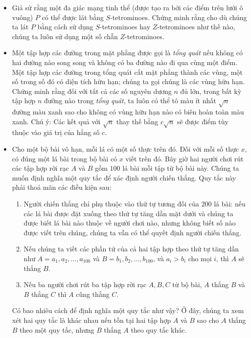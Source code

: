 \documentclass[11pt]{scrartcl}
\begin{document}
\begin{itemize}[label=, leftmargin=0em, itemsep=-0em]
    \item \begin{btvn}
    Giả sử rằng một đa giác mạng tinh thể (được tạo ra bởi các điểm trên lưới ô vuông) $P$ có thể được lát bằng $S$-tetrominoes. Chứng minh rằng cho dù chúng ta lát $P$ bằng cách sử dụng $S$-tetrominoes hay $Z$-tetrominoes như thế nào, chúng ta luôn sử dụng một số chẵn $Z$-tetrominoes.
    \end{btvn}
    \item \begin{btvn}
        Một tập hợp các đường trong mặt phẳng được gọi là \textit{tổng quát} nếu không có hai đường nào song song và không có ba đường nào đi qua cùng một điểm. Một tập hợp các đường trong tổng quát cắt mặt phẳng thành các vùng, một số trong số đó có diện tích hữu hạn; chúng ta gọi chúng là các vùng hữu hạn. Chứng minh rằng đối với tất cả các số nguyên dương $n$ đủ lớn, trong bất kỳ tập hợp $n$ đường nào trong \textit{tổng quát}, ta luôn có thể tô màu ít nhất $\sqrt{n}$ đường màu xanh sao cho không có vùng hữu hạn nào có biên hoàn toàn màu xanh.
    Chú ý: Các kết quả với $\sqrt{n}$ thay thế bằng $c\sqrt{n}$ sẽ được điểm tùy thuộc vào giá trị của hằng số $c$.
    \end{btvn}

    \item \begin{btvn}
        Cho một bộ bài vô hạn, mỗi lá có một số thực trên đó. Đối với mỗi số thực $x$, có đúng một lá bài trong bộ bài có $x$ viết trên đó. Bây giờ hai người chơi rút các tập hợp rời rạc $A$ và $B$ gồm $100$ lá bài mỗi tập từ bộ bài này. Chúng ta muốn định nghĩa một quy tắc để xác định người chiến thắng. Quy tắc này phải thoả mãn các điều kiện sau:
        \begin{enumerate}
            \item Người chiến thắng chỉ phụ thuộc vào thứ tự tương đối của $200$ lá bài: nếu các lá bài được đặt xuống theo thứ tự tăng dần mặt dưới và chúng ta được biết lá bài nào thuộc về người chơi nào, nhưng không biết số nào được viết trên chúng, chúng ta vẫn có thể quyết định người chiến thắng.
            \item Nếu chúng ta viết các phần tử của cả hai tập hợp theo thứ tự tăng dần như $A ={ a_1 , a_2 , \ldots, a_{100} }$ và $B= { b_1 , b_2 , \ldots , b_{100} }$, và $a_i > b_i$ cho mọi $i$, thì $A$ sẽ thắng $B$.
            \item Nếu ba người chơi rút ba tập hợp rời rạc $A, B, C$ từ bộ bài, $A$ thắng $B$ và $B$ thắng $C$ thì $A$ cũng thắng $C$.
        \end{enumerate}
    Có bao nhiêu cách để định nghĩa một quy tắc như vậy? Ở đây, chúng ta xem xét hai quy tắc là khác nhau nếu tồn tại hai tập hợp $A$ và $B$ sao cho $A$ thắng $B$ theo một quy tắc, nhưng $B$ thắng $A$ theo quy tắc khác.
    \end{btvn}


\end{itemize}
\end{document}
